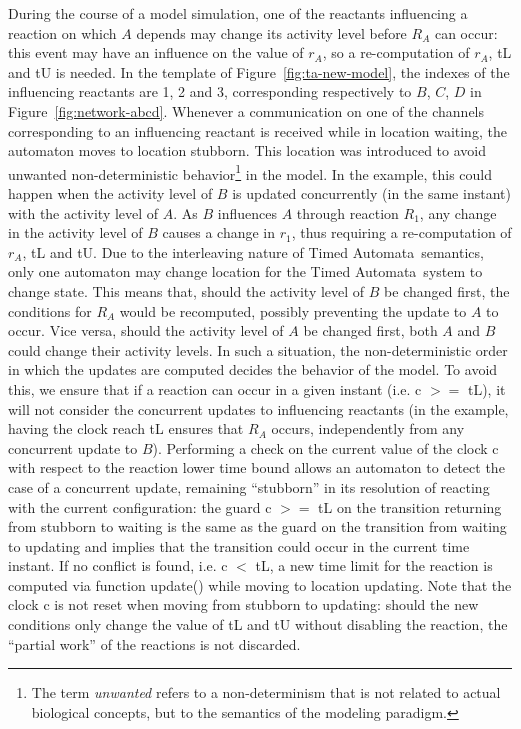 \documentclass{bmcart}
\def\tas{Timed Automata}
\begin{document}
During the course of a model simulation, one of the reactants influencing a reaction on which $A$ depends may change its activity level
before $R_A$ can occur: this event may have an influence on the value of $r_A$, so a re-computation
of $r_A$, {\sf tL} and {\sf tU} is needed.
In the template of Figure~\ref{fig:ta-new-model}, the indexes of the influencing reactants are 1, 2 and 3,
corresponding respectively to $B$, $C$, $D$ in Figure~\ref{fig:network-abcd}.
Whenever a communication on one of the channels corresponding to an influencing
reactant is received while in location {\sf waiting}, the automaton moves to location
{\sf stubborn}. This location was introduced to avoid unwanted non-deterministic behavior\footnote{The term \emph{unwanted}
refers to a non-determinism that is not related to actual biological concepts, but to the semantics of the modeling
paradigm.} in the model.
In the example, this could happen when the activity level of $B$ is updated concurrently (in the same instant) with the activity level of $A$.
As $B$ influences $A$ through reaction $R_1$, any change in the activity level of $B$ causes a change in $r_1$, thus
requiring a re-computation of $r_A$, {\sf tL} and {\sf tU}. Due to the interleaving nature of \tas\ semantics, only one automaton
may change location for the \tas\ system to change state. This means that, should the activity level of $B$ be changed
first, the conditions for $R_A$ would be recomputed, possibly preventing the update to $A$ to occur. Vice versa, should the activity
level of $A$ be changed first, both $A$ and $B$ could change their activity levels.
In such a situation, the non-deterministic order in which the updates are computed decides the behavior of the model.
To avoid this, we ensure that if a reaction can occur in a given instant (i.e. {\sf c $>=$ tL}), it will not
consider the concurrent updates to influencing reactants (in the example, having the clock reach {\sf tL} ensures that $R_A$ occurs,
independently from any concurrent update to $B$).
Performing a check on the current value of the clock {\sf c} with respect to the reaction lower time bound allows
an automaton to detect the case of a concurrent update, remaining ``stubborn'' in its resolution
of reacting with the current configuration: the guard {\sf c $>=$ tL} on
the transition returning from {\sf stubborn} to {\sf waiting}
is the same as the guard on the transition from {\sf waiting} to {\sf updating} and
implies that the transition could occur in the current time instant.
If no conflict is found, i.e. {\sf c $<$ tL}, a new time limit for the reaction is
computed via function {\sf update()} while moving to location {\sf updating}. Note that the clock {\sf c} is not reset
when moving from {\sf stubborn} to {\sf updating}: should the new conditions only change the value of {\sf tL} and {\sf tU}
without disabling the reaction, the ``partial work'' of the reactions is not discarded.
\end{document}
